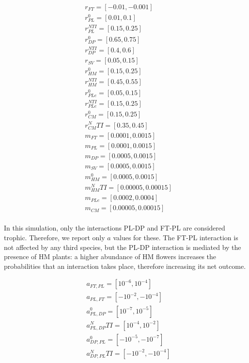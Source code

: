 \begin{align*}
& r_{FT} = [-0.01,-0.001] \\
& r_{PL}^0 = [0.01,0.1] \\
& r_{PL}^{NTI} = [0.15,0.25] \\
& r_{DP}^0 = [0.65,0.75] \\
& r_{DP}^{NTI} = [0.4,0.6] \\
& r_{SV} = [0.05,0.15] \\
& r_{HM}^0 = [0.15,0.25] \\
& r_{HM}^{NTI} = [0.45,0.55] \\
& r_{PLe}^0 = [0.05,0.15] \\
& r_{PLe}^{NTI} = [0.15,0.25] \\
& r_{CM}^0 = [0.15,0.25] \\
& r_{CM}^NTI = [0.35,0.45] \\
& m_{FT} = [0.0001,0.0015] \\
& m_{PL} = [0.0001,0.0015] \\
& m_{DP} = [0.0005,0.0015] \\
& m_{SV} = [0.0005,0.0015] \\
& m_{HM}^0 = [0.0005,0.0015] \\
& m_{HM}^NTI = [0.00005,0.00015] \\
& m_{PLe} = [0.0002,0.0004] \\
& m_{CM} = [0.00005,0.00015] \\
\end{align*}

In this simulation, only the interactions PL-DP and FT-PL are considered trophic. Therefore, we report only $a$ values for these. The FT-PL interaction is not affected by any third species, but the PL-DP interaction is mediated by the presence of HM plants: a higher abundance of HM flowers increases the probabilities that an interaction takes place, therefore increasing its net outcome.

\begin{align*}
& a_{FT,PL} = [10^{-6},10^{-4}] \\
& a_{PL,FT} = [-10^{-2},-10^{-4}] \\
& a_{PL,DP}^0 = [10^{-7},10^{-5}] \\
& a_{PL,DP}^NTI = [10^{-4},10^{-2}] \\
& a_{DP,PL}^0 = [-10^{-5},-10^{-7}] \\
& a_{DP,PL}^NTI = [-10^{-2},-10^{-4}] \\
\end{align*}

